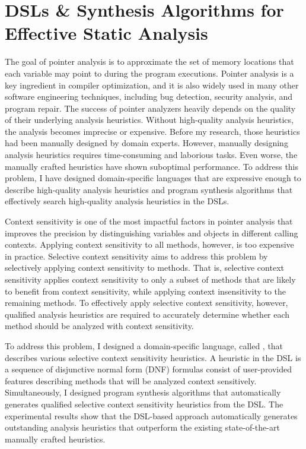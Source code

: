 \documentclass[11pt]{article}
\newcommand{\myparagraph}[1]{\medskip\noindent{\it \textbf{#1.}}}
\begin{document}
\section{DSLs \& Synthesis Algorithms for Effective Static Analysis}
%
The goal of pointer analysis is to approximate the set of memory locations that each variable may point to during the program executions.
%
Pointer analysis is a key ingredient in compiler optimization, and it is also widely used in many other software engineering techniques, including bug detection, security analysis, and program repair.
%
The success of pointer analyzers heavily depends on the quality of their underlying analysis heuristics.
%
Without high-quality analysis heuristics, the analysis becomes imprecise or expensive.
%
Before my research, those heuristics had been manually designed by domain experts. 
%
However, manually designing analysis heuristics requires time-consuming and laborious tasks.
%
Even worse, the manually crafted heuristics have shown suboptimal performance.
%
To address this problem, I have designed domain-specific languages that are expressive enough to describe high-quality analysis heuristics and program synthesis algorithms that effectively search  high-quality analysis heuristics in the DSLs.



\myparagraph{Disjunctive Model $\&$ Synthesis Algorithms~\cite{JeJeChOh17,Jeon2019,IST2021}}
%
Context sensitivity is one of the most impactful factors in pointer analysis that improves the precision by distinguishing variables and objects in different calling contexts.
%
Applying context sensitivity to all methods, however, is too expensive in practice.
%
Selective context sensitivity aims to address this problem by selectively applying context sensitivity to methods.
%
That is, selective context sensitivity applies context sensitivity to only a subset of methods that are likely to benefit from context sensitivity, while applying context insensitivity to the remaining methods.
%
To effectively apply selective context sensitivity, however, qualified analysis heuristics are required to accurately determine whether each method should be analyzed with context sensitivity.




To address this problem, I designed a domain-specific language, called \DisjunctiveModel, that describes various selective context sensitivity heuristics.
%
A heuristic in the DSL is a sequence of disjunctive normal form (DNF) formulas consist of user-provided features describing methods that will be analyzed context sensitively.
%
Simultaneously, I designed program synthesis algorithms that automatically generates qualified selective context sensitivity heuristics from the DSL.
%
The experimental results show that the DSL-based approach automatically generates outstanding analysis heuristics that outperform the existing state-of-the-art manually crafted heuristics.
%
\end{document}
